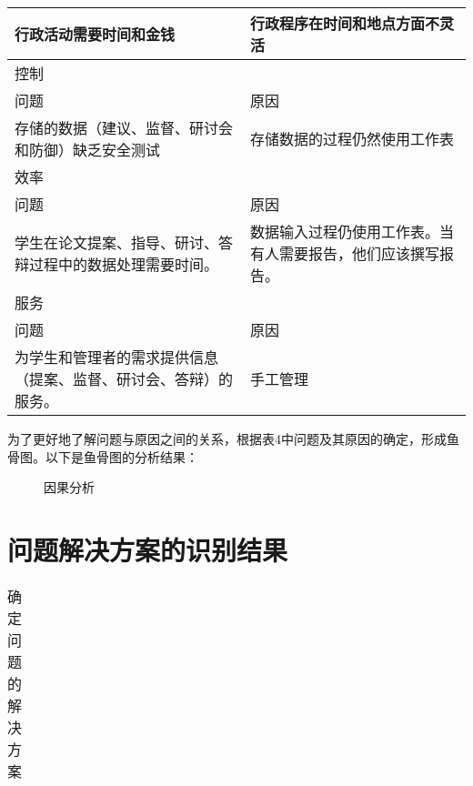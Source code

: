 \begin{table}[htbp]
\begin{tabular}{p{6cm}p{6cm}}
            行政活动需要时间和金钱                                               & 行政程序在时间和地点方面不灵活                               \\ \hline
            \multicolumn{2}{l}{控制}                                                                                                            \\ \hline
            问题                                                                 & 原因                                                         \\
            存储的数据（建议、监督、研讨会和防御）缺乏安全测试                   & 存储数据的过程仍然使用工作表                                 \\ \hline
            \multicolumn{2}{l}{效率}                                                                                                            \\ \hline
            问题                                                                 & 原因                                                         \\
            学生在论文提案、指导、研讨、答辩过程中的数据处理需要时间。           & 数据输入过程仍使用工作表。当有人需要报告，他们应该撰写报告。 \\ \hline
            \multicolumn{2}{l}{服务}                                                                                                            \\ \hline
            问题                                                                 & 原因                                                         \\
            为学生和管理者的需求提供信息（提案、监督、研讨会、答辩）的服务。     & 手工管理
      \end{tabular}
\end{table}

为了更好地了解问题与原因之间的关系，根据表4中问题及其原因的确定，形成鱼骨图。以下是鱼骨图的分析结果：

\begin{figure}[htbp]
      \centering
      \label{}
      \caption{\song\wuhao 因果分析}
\end{figure}

\section{问题解决方案的识别结果}

\begin{table}[htbp]
      \centering
      \song\wuhao
      \caption{确定问题的解决方案}
      \label{确定问题的解决方案}
      \begin{tabular}{lp{9cm}}
      \end{tabular}
\end{table}

